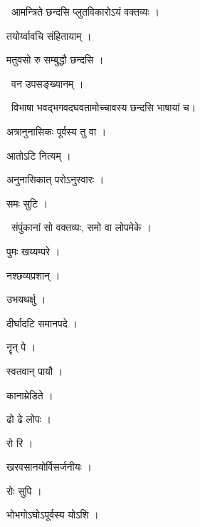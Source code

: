 \documentclass[10pt, openany, oneside]{book}
\begin{document}
\par\noindent\hspace{1.5em}{\vps वा॰}~{\qt आमन्त्रिते छन्दसि प्लुतविकारोऽयं वक्तव्यः ।}

\noindent तयोर्य्वावचि संहितायाम् ।

\noindent मतुवसो रु सम्बुद्धौ छन्दसि ।

\par\noindent\hspace{1.5em}{\vps वा॰}~{\qt वन उपसङ्ख्यानम् ।}

\par\noindent\hspace{1.5em}{\vps वा॰}~{\qt विभाषा भवद्भगवदघवतामोच्चावस्य छन्दसि भाषायां च।}

\noindent अत्रानुनासिकः पूर्वस्य तु वा ।

\noindent आतोऽटि नित्यम् ।

\noindent अनुनासिकात् परोऽनुस्वारः ।

\noindent समः सुटि ।

\par\noindent\hspace{1.5em}{\vps वा॰}~{\qt संपुंकानां सो वक्तव्यः, समो वा लोपमेके ।}

\noindent पुमः खय्यम्परे ।

\noindent नश्छव्यप्रशान् ।

\noindent उभयथर्क्षु ।

\noindent दीर्घादटि समानपदे ।

\noindent नॄन् पे ।

\noindent स्वतवान् पायौ ।

\noindent कानाम्रेडिते ।

\noindent ढो ढे लोपः ।

\noindent रो रि ।

\noindent खरवसानयोर्विसर्जनीयः ।

\noindent रोः सुपि ।

\noindent भोभगोऽघोऽपूर्वस्य योऽशि ।
\end{document}
